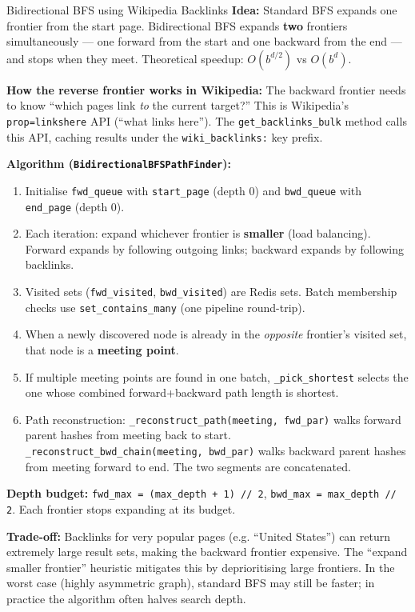 \documentclass[11pt,a4paper]{article}
\begin{document}
\begin{decisionbox}{Bidirectional BFS using Wikipedia Backlinks}
\textbf{Idea:} Standard BFS expands one frontier from the start page. Bidirectional BFS expands \textbf{two} frontiers simultaneously --- one forward from the start and one backward from the end --- and stops when they meet. Theoretical speedup: $O(b^{d/2})$ vs $O(b^d)$.

\textbf{How the reverse frontier works in Wikipedia:} The backward frontier needs to know ``which pages link \emph{to} the current target?'' This is Wikipedia's \texttt{prop=linkshere} API (``what links here''). The \texttt{get\_backlinks\_bulk} method calls this API, caching results under the \texttt{wiki\_backlinks:} key prefix.

\textbf{Algorithm (\texttt{BidirectionalBFSPathFinder}):}
\begin{enumerate}[leftmargin=*, nosep]
    \item Initialise \texttt{fwd\_queue} with \texttt{start\_page} (depth 0) and \texttt{bwd\_queue} with \texttt{end\_page} (depth 0).
    \item Each iteration: expand whichever frontier is \textbf{smaller} (load balancing). Forward expands by following outgoing links; backward expands by following backlinks.
    \item Visited sets (\texttt{fwd\_visited}, \texttt{bwd\_visited}) are Redis sets. Batch membership checks use \texttt{set\_contains\_many} (one pipeline round-trip).
    \item When a newly discovered node is already in the \textit{opposite} frontier's visited set, that node is a \textbf{meeting point}.
    \item If multiple meeting points are found in one batch, \texttt{\_pick\_shortest} selects the one whose combined forward+backward path length is shortest.
    \item Path reconstruction: \texttt{\_reconstruct\_path(meeting, fwd\_par)} walks forward parent hashes from meeting back to start. \texttt{\_reconstruct\_bwd\_chain(meeting, bwd\_par)} walks backward parent hashes from meeting forward to end. The two segments are concatenated.
\end{enumerate}

\textbf{Depth budget:} \texttt{fwd\_max = (max\_depth + 1) // 2}, \texttt{bwd\_max = max\_depth // 2}. Each frontier stops expanding at its budget.

\textbf{Trade-off:} Backlinks for very popular pages (e.g. ``United States'') can return extremely large result sets, making the backward frontier expensive. The ``expand smaller frontier'' heuristic mitigates this by deprioritising large frontiers. In the worst case (highly asymmetric graph), standard BFS may still be faster; in practice the algorithm often halves search depth.
\end{decisionbox}
\end{document}
